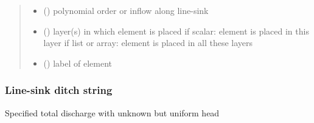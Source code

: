 \documentclass[letterpaper,10pt,english]{sphinxmanual}
\begin{document}
\begin{fulllineitems}
\begin{quote}
\begin{description}
\begin{itemize}
\item {} 
 (\sphinxstyleliteralemphasis{ (}\sphinxstyleliteralemphasis{)}) \textendash{} polynomial order or inflow along line-sink

\item {} 
 (\sphinxstyleliteralemphasis{, }) \textendash{} layer(s) in which element is placed
if scalar: element is placed in this layer
if list or array: element is placed in all these layers

\item {} 
 () \textendash{} label of element

\end{itemize}

\end{description}\end{quote}




{\hyperref[\detokenize{linesinks/linesinkditchstring:timml.linesink.LineSinkDitchString}]{}}



\end{fulllineitems}



\subsubsection{Line-sink ditch string}
\label{\detokenize{linesinks/linesinkditchstring:line-sink-ditch-string}}\label{\detokenize{linesinks/linesinkditchstring::doc}}
Specified total discharge with unknown but uniform head
\end{document}
